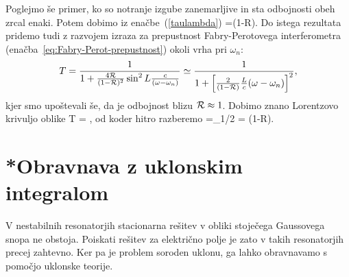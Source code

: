 \noindent
Poglejmo še primer, ko so notranje izgube zanemarljive in sta odbojnosti obeh zrcal enaki.
Potem dobimo iz enačbe~(\ref{taulambda})
\beq
{}=(1-{\cal R}).
\eeq
Do istega rezultata pridemo tudi z razvojem izraza za prepustnost Fabry-Perotovega 
interferometra (enačba~\ref{eq:Fabry-Perot-prepustnost})
okoli vrha pri $\omega_{n}$:
\begin{equation}
T=\frac{1}{1+\frac{4{\cal R}}{(1-{\cal R})^{2}}\sin^{2}L\frac{c}{(\omega-\omega_{n})}}\simeq\frac{1}{1+\left[\frac{2}{(1-{\cal R})}\frac{L}{c}(\omega-\omega_{n})\right]^{2}},
\label{3.27}
\end{equation}
 kjer smo upoštevali še, da je odbojnost blizu ${\cal R} \approx 1$. Dobimo znano Lorentzovo
 krivuljo oblike
 \beq
 T = ,
 \eeq
od koder hitro razberemo 
\beq
{}=\Delta\omega_{1/2} = (1-{\cal R}).
\eeq

\section{*Obravnava z uklonskim integralom}
\label{Resonator_uklon}

V nestabilnih resonatorjih stacionarna rešitev v obliki stoječega
Gaussovega snopa ne obstoja. Poiskati rešitev za električno polje je
zato v takih resonatorjih precej zahtevno. 
Ker pa je problem soroden uklonu, ga lahko obravnavamo s pomočjo 
uklonske teorije.\\

